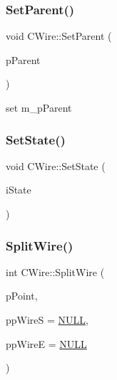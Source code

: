 \subsubsection{\texorpdfstring{SetParent()}{SetParent()}}
{\footnotesize\ttfamily void C\+Wire\+::\+Set\+Parent (\begin{DoxyParamCaption}\item[{\mbox{\hyperlink{classCNet}{C\+Net}} $\ast$}]{p\+Parent }\end{DoxyParamCaption})}

set m\+\_\+p\+Parent \mbox{\label{classCWire_aa21e8506c023f4c32481eaccdfeccc2e}} 
\subsubsection{\texorpdfstring{SetState()}{SetState()}}
{\footnotesize\ttfamily void C\+Wire\+::\+Set\+State (\begin{DoxyParamCaption}\item[{int}]{i\+State }\end{DoxyParamCaption})}

\mbox{\label{classCWire_a16b47186198867b019f35eac02b6c52e}} 
\subsubsection{\texorpdfstring{SplitWire()}{SplitWire()}}
{\footnotesize\ttfamily int C\+Wire\+::\+Split\+Wire (\begin{DoxyParamCaption}\item[{\mbox{\hyperlink{classCPoint}{C\+Point}} $\ast$}]{p\+Point,  }\item[{\mbox{\hyperlink{classCWire}{C\+Wire}} $\ast$$\ast$}]{pp\+WireS = {\ttfamily \mbox{\hyperlink{BoxRouter_8h_a070d2ce7b6bb7e5c05602aa8c308d0c4}{N\+U\+LL}}},  }\item[{\mbox{\hyperlink{classCWire}{C\+Wire}} $\ast$$\ast$}]{pp\+WireE = {\ttfamily \mbox{\hyperlink{BoxRouter_8h_a070d2ce7b6bb7e5c05602aa8c308d0c4}{N\+U\+LL}}} }\end{DoxyParamCaption})}

\mbox{\label{classCWire_a2f7cf29379c4f0a57e0c08e321cb25a2}} 
